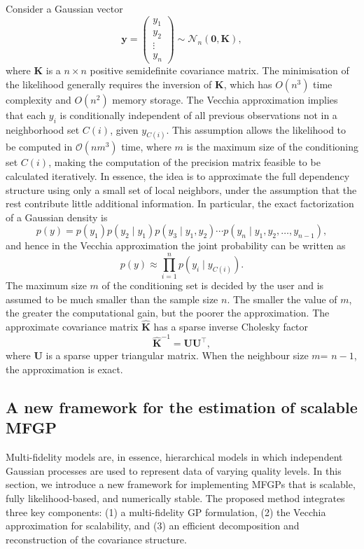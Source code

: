 \documentclass[12pt]{article}
\begin{document}
Consider a Gaussian vector \[
\bm{y} = \begin{pmatrix}
y_1 \\
y_2 \\
\vdots \\
y_n
\end{pmatrix} \sim \mathcal{N}_n(\bm{0}, \bm{K}),
\]
where $\bm{K}$ is a $n \times  n$ positive semidefinite covariance matrix. The minimisation of the likelihood generally requires the inversion of $\bm{K}$, which has $O(n^3)$ time complexity and $O(n^2)$ memory storage. The Vecchia approximation implies that each \( y_i \) is conditionally independent of all previous observations not in a neighborhood set \( C(i) \), given \( y_{C(i)} \). This assumption allows the likelihood to be computed in \( \mathcal{O}(nm^3) \) time, where \( m \) is the maximum size of the conditioning set  \( C(i) \), making the computation of the precision matrix feasible to be calculated iteratively. In essence, the idea is to approximate the full dependency structure using only a small set of local neighbors, under the assumption that the rest contribute little additional information. In particular, the exact factorization of a Gaussian density is \[
p(y) = p(y_1) p(y_2 \mid y_1) p(y_3 \mid y_1, y_2) \cdots p(y_n \mid y_1, y_2, \ldots, y_{n-1}),
\] and hence in the Vecchia approximation the joint probability can be written as \[
p(y) \approx \prod_{i=1}^n p(y_i \mid y_{C(i)}).
\]
 The maximum size $m$  of the conditioning set is decided by the user and is assumed to be much smaller than the sample size $n$. The smaller the value of $m$, the greater the computational gain, but the poorer the approximation. The approximate covariance matrix $\hat{\bm{K}}$ has a sparse inverse Cholesky factor
\[
\hat{\bm{K}}^{-1} = \bm{U} \bm{U}^\top, 
\]
where $\bm{U}$ is a sparse upper triangular matrix. When the neighbour size $m$= $n-1$, the approximation is exact. 


\subsection{A new framework for the estimation of scalable MFGP}
\label{NewMethod}
Multi-fidelity models are, in essence, hierarchical models in which independent Gaussian
processes are used to represent data of varying quality levels. In this section, we introduce a new framework for implementing MFGPs that is scalable, fully likelihood-based, and numerically stable. The proposed method integrates three key components: (1) a multi-fidelity GP formulation, (2) the Vecchia approximation for scalability, and (3) an efficient decomposition and reconstruction of the covariance structure. %
\end{document}
